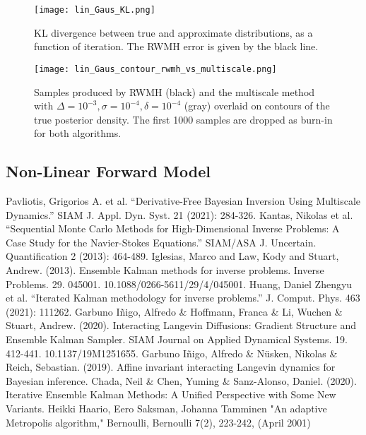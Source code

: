 \documentclass[12pt]{article}
\begin{document}
\begin{figure}[h] 
\centering
\texttt{[image: lin\_Gaus\_KL.png]}
\caption{KL divergence between true and approximate distributions, as a function of iteration. The RWMH error is given by the black line.}
\label{fig:lin_Gaus_KL}
\end{figure}

\begin{figure}[h] 
\centering
\texttt{[image: lin\_Gaus\_contour\_rwmh\_vs\_multiscale.png]}
\caption{Samples produced by RWMH (black) and the multiscale method with $\Delta=10^{-3}, \sigma=10^{-4}, \delta=10^{-4}$ (gray) overlaid on contours of the true posterior density. The first 1000 samples
are dropped as burn-in for both algorithms.}
\label{fig:lin_Gaus_contour}
\end{figure}

\subsection{Non-Linear Forward Model}





\begin{thebibliography}{20}
 Pavliotis, Grigorios A. et al. “Derivative-Free Bayesian Inversion Using Multiscale Dynamics.” SIAM J. Appl. Dyn. Syst. 21 (2021): 284-326. 
 Kantas, Nikolas et al. “Sequential Monte Carlo Methods for High-Dimensional Inverse Problems: A Case Study for the Navier-Stokes Equations.” SIAM/ASA J. Uncertain. Quantification 2 (2013): 464-489. 
 Iglesias, Marco and Law, Kody and Stuart, Andrew. (2013). Ensemble Kalman methods for inverse problems. Inverse Problems. 29. 045001. 10.1088/0266-5611/29/4/045001. 
 Huang, Daniel Zhengyu et al. “Iterated Kalman methodology for inverse problems.” J. Comput. Phys. 463 (2021): 111262.
 Garbuno Iñigo, Alfredo \& Hoffmann, Franca \& Li, Wuchen \& Stuart, Andrew. (2020). Interacting Langevin Diffusions: Gradient Structure and Ensemble Kalman Sampler. SIAM Journal on Applied Dynamical Systems. 19. 412-441. 10.1137/19M1251655. 
 Garbuno Iñigo, Alfredo \& Nüsken, Nikolas \& Reich, Sebastian. (2019). Affine invariant interacting Langevin dynamics for Bayesian inference. 
 Chada, Neil \& Chen, Yuming \& Sanz-Alonso, Daniel. (2020). Iterative Ensemble Kalman Methods: A Unified Perspective with Some New Variants. 
 Heikki Haario, Eero Saksman, Johanna Tamminen "An adaptive Metropolis algorithm," Bernoulli, Bernoulli 7(2), 223-242, (April 2001)
\end{thebibliography}
\end{document}
